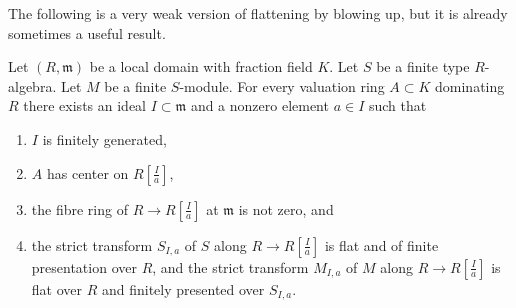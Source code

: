 \noindent
The following is a very weak version of flattening by blowing up, but
it is already sometimes a useful result.

\begin{lemma}
\label{lemma-flatten-on-affine-blowup}
Let $(R, \mathfrak m)$ be a local domain with fraction field $K$.
Let $S$ be a finite type $R$-algebra.
Let $M$ be a finite $S$-module.
For every valuation ring $A \subset K$ dominating $R$
there exists an ideal $I \subset \mathfrak m$ and a nonzero
element $a \in I$ such that
\begin{enumerate}
\item $I$ is finitely generated,
\item $A$ has center on $R[\frac{I}{a}]$,
\item the fibre ring of $R \to R[\frac{I}{a}]$ at $\mathfrak m$
is not zero, and
\item the strict transform $S_{I, a}$ of $S$ along $R \to R[\frac{I}{a}]$
is flat and of finite presentation over $R$, and the strict transform
$M_{I, a}$ of $M$ along $R \to R[\frac{I}{a}]$ is flat over $R$ and
finitely presented over $S_{I, a}$.
\end{enumerate}
\end{lemma}

